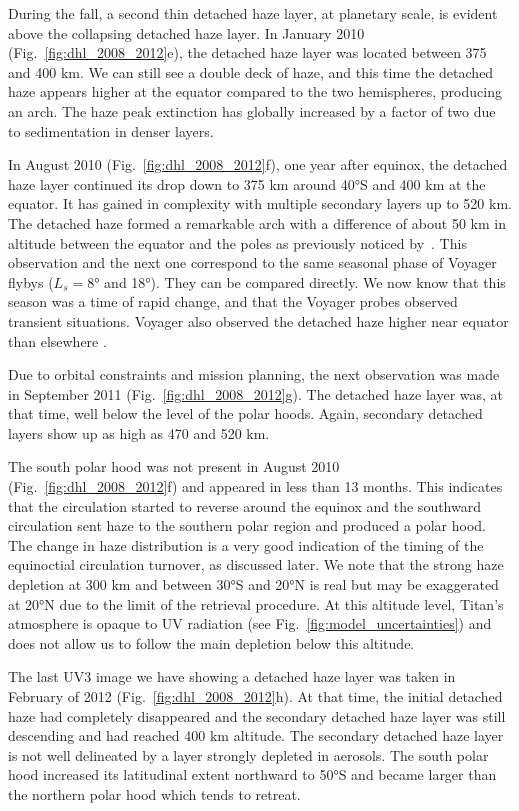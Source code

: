 During the fall, a second thin detached haze layer, at planetary scale, is evident above the collapsing detached
haze layer. In January 2010 (Fig.~\ref{fig:dhl_2008_2012}e), the detached haze layer was located between 375 and 400 km.
We can still see a double deck of haze, and this time the detached haze appears higher at the equator compared to the two
hemispheres, producing an arch. The haze peak extinction has globally increased by a factor of two due to sedimentation
in denser layers.

In August 2010 (Fig.~\ref{fig:dhl_2008_2012}f), one year after equinox, the detached haze layer continued
its drop down to 375 km around \ang{40}S and 400 km at the equator. It has gained in complexity with
multiple secondary layers up to 520 km. The detached haze formed a remarkable arch with a difference of about 50 km
in altitude between the equator and the poles as previously noticed by~\cite{West2011}.
This observation and the next one correspond to the same seasonal phase  of Voyager flybys ($L_s=\ang{8}$ and \ang{18}).
They can be compared directly.
We now know that this season was a time of rapid change, and that the Voyager probes observed transient situations.
Voyager also observed the detached haze higher near equator than elsewhere \citep{Rages1983, Rannou2000}.

Due to orbital constraints and mission planning, the next observation was made in September 2011
(Fig.~\ref{fig:dhl_2008_2012}g). The detached haze layer was, at that time, well below the level of the polar hoods.
Again, secondary detached layers show up as high as 470 and 520 km.

The south polar hood was not present in August 2010 (Fig.~\ref{fig:dhl_2008_2012}f) and appeared in less than 13 months.
This indicates that the circulation started to reverse around the equinox and the southward circulation sent haze to
the southern polar region and produced a polar hood. The change in haze distribution
is a very good indication of the timing of the equinoctial circulation turnover, as  discussed later. We note
that the strong haze depletion at 300 km and between \ang{30}S and \ang{20}N is real but may be exaggerated at \ang{20}N
due to the limit of the retrieval procedure. At this altitude level, Titan's atmosphere is opaque to UV radiation
(see Fig.~\ref{fig:model_uncertainties}) and does not allow us to follow the main depletion below this altitude.

The last UV3 image we have showing a detached haze layer was taken in February of 2012 (Fig.~\ref{fig:dhl_2008_2012}h). At that
time, the initial detached haze had completely disappeared and the secondary detached haze layer was still descending
and had reached 400 km altitude. The secondary detached haze layer is not well delineated by a layer strongly depleted in aerosols.
The south polar hood increased its latitudinal extent northward to \ang{50}S and became larger than the northern
polar hood which tends to retreat.
